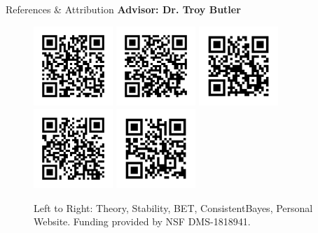 \begin{block}{References \& Attribution}
    \centering
    \textbf{Advisor: Dr. Troy Butler}
    \begin{figure}
        \includegraphics[width=3cm]{figures/ref-theory}
        \includegraphics[width=3cm]{figures/ref-stability}
        \includegraphics[width=3cm]{figures/ref-bet}
        \includegraphics[width=3cm]{figures/ref-cb}
        \includegraphics[width=3cm]{figures/ref-website}
    \caption{\centering Left to Right: Theory, Stability, BET, ConsistentBayes, Personal Website. \newline Funding provided by NSF DMS-1818941.}
    \end{figure}

\end{block}

